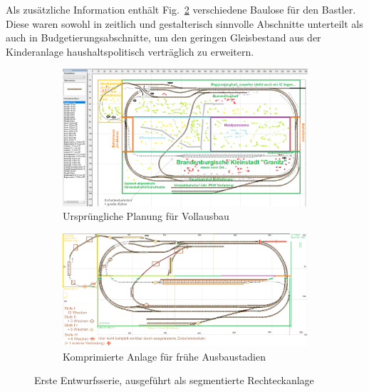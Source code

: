 Als zus\"atzliche Information enth\"alt Fig.~\ref{img:state0-1_granitz_modules_compressed} verschiedene Baulose f\"ur den Bastler.
Diese waren sowohl in zeitlich und gestalterisch sinnvolle Abschnitte unterteilt als auch in Budgetierungsabschnitte, um den geringen Gleisbestand aus der Kinderanlage haushaltspolitisch vertr\"aglich zu erweitern.

\begin{figure}[h]
\centering
	\begin{subfigure}[b]{1.0\textwidth}
    \includegraphics[width=1.0\textwidth]{img/map_evolution/state0-1_granitz_modules_details.png}
   \caption{Urspr\"ungliche Planung f\"ur Vollausbau}
    \label{img:state0-1_granitz_modules_details}
    \end{subfigure}
	\begin{subfigure}[b]{1.0\textwidth}
    \includegraphics[width=1.0\textwidth]{img/map_evolution/state0-1_granitz_modules_compressed.png}
   \caption{Komprimierte Anlage f\"ur fr\"uhe Ausbaustadien}
    \label{img:state0-1_granitz_modules_compressed}
    \end{subfigure}
	\caption{Erste Entwurfsserie, ausgef\"uhrt als segmentierte Rechteckanlage}
	\label{img:state0-1_granitz}
\end{figure}


